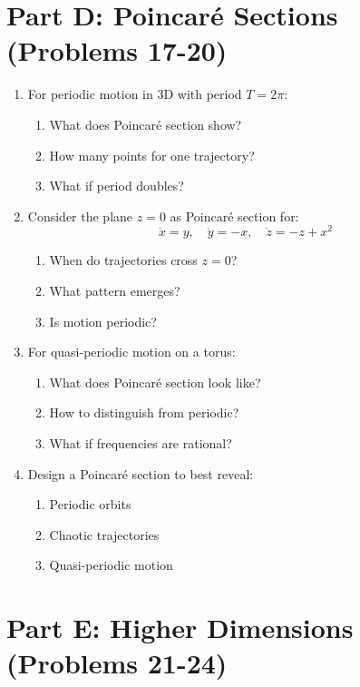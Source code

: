 \documentclass[12pt]{article}
\begin{document}
\section*{Part D: Poincaré Sections (Problems 17-20)}

\begin{enumerate}[resume]
\item For periodic motion in 3D with period $T = 2\pi$:
\begin{enumerate}[label=(\alph*)]
    \item What does Poincaré section show?
    \item How many points for one trajectory?
    \item What if period doubles?
\end{enumerate}

\item Consider the plane $z = 0$ as Poincaré section for:
$$\dot{x} = y, \quad \dot{y} = -x, \quad \dot{z} = -z + x^{2}$$
\begin{enumerate}[label=(\alph*)]
    \item When do trajectories cross $z = 0$?
    \item What pattern emerges?
    \item Is motion periodic?
\end{enumerate}

\item For quasi-periodic motion on a torus:
\begin{enumerate}[label=(\alph*)]
    \item What does Poincaré section look like?
    \item How to distinguish from periodic?
    \item What if frequencies are rational?
\end{enumerate}

\item Design a Poincaré section to best reveal:
\begin{enumerate}[label=(\alph*)]
    \item Periodic orbits
    \item Chaotic trajectories
    \item Quasi-periodic motion
\end{enumerate}
\end{enumerate}

\section*{Part E: Higher Dimensions (Problems 21-24)}
\end{document}
